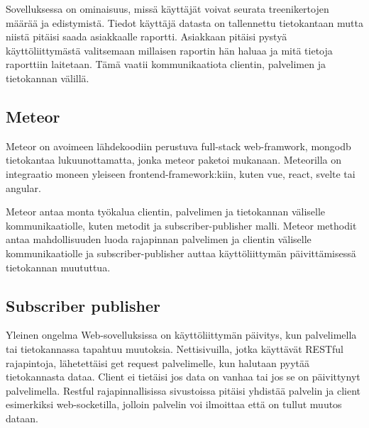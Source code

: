 


Sovelluksessa on ominaisuus, missä käyttäjät voivat seurata treenikertojen määrää ja edistymistä.
Tiedot käyttäjä datasta on tallennettu tietokantaan mutta niistä pitäisi saada asiakkaalle raportti.
Asiakkaan pitäisi pystyä käyttöliittymästä valitsemaan millaisen raportin hän haluaa ja mitä tietoja raporttiin laitetaan.
Tämä vaatii kommunikaatiota clientin, palvelimen ja tietokannan välillä. 
\medskip

\subsection*{Meteor}


Meteor on avoimeen lähdekoodiin perustuva full-stack web-framwork, mongodb tietokantaa lukuunottamatta, jonka meteor paketoi mukanaan.
Meteorilla on integraatio moneen yleiseen frontend-framework:kiin, kuten vue, react, svelte tai angular.
\medskip




Meteor antaa monta työkalua clientin, palvelimen ja tietokannan väliselle kommunikaatiolle, kuten metodit ja subscriber-publisher malli.
Meteor methodit antaa mahdollisuuden luoda rajapinnan palvelimen ja clientin väliselle kommunikaatiolle ja 
subscriber-publisher auttaa käyttöliittymän päivittämisessä tietokannan muututtua.





\medskip







\subsection*{Subscriber publisher}

Yleinen ongelma Web-sovelluksissa on käyttöliittymän päivitys, kun palvelimella tai tietokannassa tapahtuu muutoksia. 
Nettisivuilla, jotka käyttävät RESTful rajapintoja, lähetettäisi get request palvelimelle, kun halutaan pyytää tietokannasta dataa. Client ei tietäisi jos data on vanhaa tai jos se on päivittynyt palvelimella.
Restful rajapinnallisissa sivustoissa pitäisi yhdistää palvelin ja client esimerkiksi web-socketilla, jolloin palvelin voi ilmoittaa että on tullut muutos dataan.

